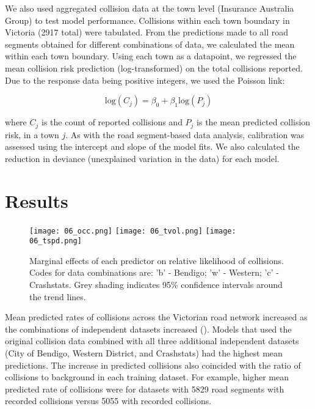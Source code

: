 We also used aggregated collision data at the town level (Insurance Australia Group) to test model performance. Collisions within each town boundary in Victoria (2917 total) were tabulated. From the predictions made to all road segments obtained for different combinations of data, we calculated the mean within each town boundary. Using each town as a datapoint, we regressed the mean collision risk prediction (log-transformed) on the total collisions reported. Due to the response data being positive integers, we used the Poisson link:

\begin{equation} \label{eq:62}
\text{log}(C_j) = \beta_0 + \beta_1\text{log}(P_j)
\end{equation}

\noindent where $C_j$ is the count of reported collisions and $P_j$ is the mean predicted collision risk, in a town $j$. As with the road segment-based data analysis, calibration was assessed using the intercept and slope of the model fits. We also calculated the reduction in deviance (unexplained variation in the data) for each model.

\section{Results}

\begin{figure*}[htp]
  \centering
  \texttt{[image: 06\_occ.png]}
  \texttt{[image: 06\_tvol.png]}
  \texttt{[image: 06\_tspd.png]}
  \caption[]{Marginal effects of each predictor on relative likelihood of collisions. Codes for data combinations are: 'b' - Bendigo; 'w' - Western; 'c' - Crashstats. Grey shading indicates 95\% confidence intervals around the trend lines.}
  \label{val_effects}
\end{figure*}

Mean predicted rates of collisions across the Victorian road network increased as the combinations of independent datasets increased (). Models that used the original collision data combined with all three additional independent datasets (City of Bendigo, Western District, and Crashstats) had the highest mean predictions. The increase in predicted collisions also coincided with the ratio of collisions to background in each training dataset. For example, higher mean predicted rate of collisions were for datasets with 5829 road segments with recorded collisions versus 5055 with recorded collisions.

